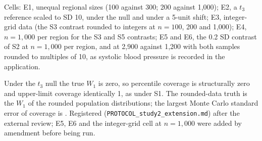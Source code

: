 \documentclass[AMA,Times1COL]{WileyNJDv5}
\begin{document}
\begin{table}[ht]
\centering
\caption{Registered extension of the estimation study: unequal regional sizes, a $t_3$ reference distribution, integer-grid data, $n = 1{,}000$ per region and a 0.2 SD contrast at sample sizes like those of the application. Bias, RMSE and mean width in the original units; coverage of the 95\% percentile interval and of its one-sided 97.5\% upper limit.\label{tab:study2_ext}}
\begin{tablenotes}
\item Cells: E1, unequal regional sizes (100 against 300; 200 against 1{,}000); E2, a $t_3$ reference scaled to SD 10, under the null and under a 5-unit shift; E3, integer-grid data (the S3 contrast rounded to integers at $n = 100$, 200 and 1{,}000); E4, $n = 1{,}000$ per region for the S3 and S5 contrasts; E5 and E6, the 0.2 SD contrast of S2 at $n = 1{,}000$ per region, and at 2{,}900 against 1{,}200 with both samples rounded to multiples of 10, as systolic blood pressure is recorded in the application.
\item Under the $t_3$ null the true $W_1$ is zero, so percentile coverage is structurally zero and upper-limit coverage identically 1, as under S1. The rounded-data truth is the $W_1$ of the rounded population distributions; the largest Monte Carlo standard error of coverage is . Registered (\texttt{PROTOCOL\_study2\_extension.md}) after the external review; E5, E6 and the integer-grid cell at $n = 1{,}000$ were added by amendment before being run.
\end{tablenotes}
\end{table}
\end{document}
